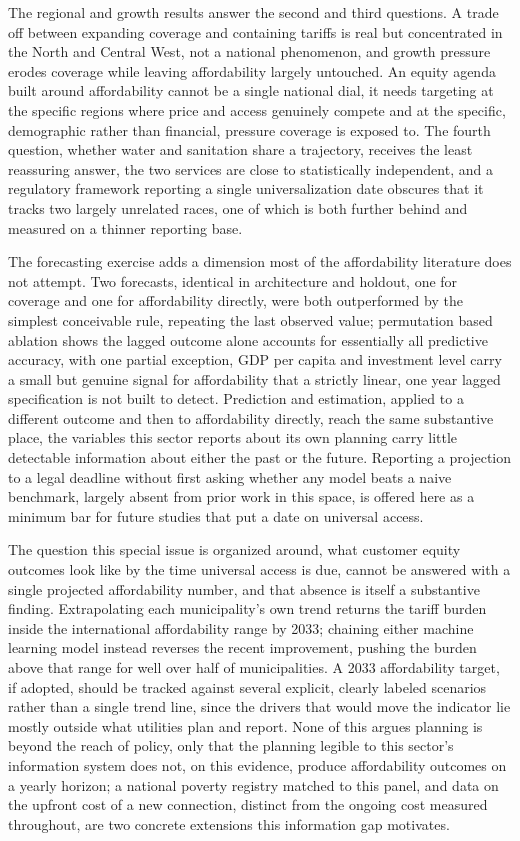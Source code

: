 \documentclass[preprint,12pt]{elsarticle}
\begin{document}
The regional and growth results answer the second and third questions. A trade off between expanding coverage and containing tariffs is real but concentrated in the North and Central West, not a national phenomenon, and growth pressure erodes coverage while leaving affordability largely untouched. An equity agenda built around affordability cannot be a single national dial, it needs targeting at the specific regions where price and access genuinely compete and at the specific, demographic rather than financial, pressure coverage is exposed to. The fourth question, whether water and sanitation share a trajectory, receives the least reassuring answer, the two services are close to statistically independent, and a regulatory framework reporting a single universalization date obscures that it tracks two largely unrelated races, one of which is both further behind and measured on a thinner reporting base.

The forecasting exercise adds a dimension most of the affordability literature does not attempt. Two forecasts, identical in architecture and holdout, one for coverage and one for affordability directly, were both outperformed by the simplest conceivable rule, repeating the last observed value; permutation based ablation shows the lagged outcome alone accounts for essentially all predictive accuracy, with one partial exception, GDP per capita and investment level carry a small but genuine signal for affordability that a strictly linear, one year lagged specification is not built to detect. Prediction and estimation, applied to a different outcome and then to affordability directly, reach the same substantive place, the variables this sector reports about its own planning carry little detectable information about either the past or the future. Reporting a projection to a legal deadline without first asking whether any model beats a naive benchmark, largely absent from prior work in this space, is offered here as a minimum bar for future studies that put a date on universal access.

The question this special issue is organized around, what customer equity outcomes look like by the time universal access is due, cannot be answered with a single projected affordability number, and that absence is itself a substantive finding. Extrapolating each municipality's own trend returns the tariff burden inside the international affordability range by 2033; chaining either machine learning model instead reverses the recent improvement, pushing the burden above that range for well over half of municipalities. A 2033 affordability target, if adopted, should be tracked against several explicit, clearly labeled scenarios rather than a single trend line, since the drivers that would move the indicator lie mostly outside what utilities plan and report. None of this argues planning is beyond the reach of policy, only that the planning legible to this sector's information system does not, on this evidence, produce affordability outcomes on a yearly horizon; a national poverty registry matched to this panel, and data on the upfront cost of a new connection, distinct from the ongoing cost measured throughout, are two concrete extensions this information gap motivates.
\end{document}
